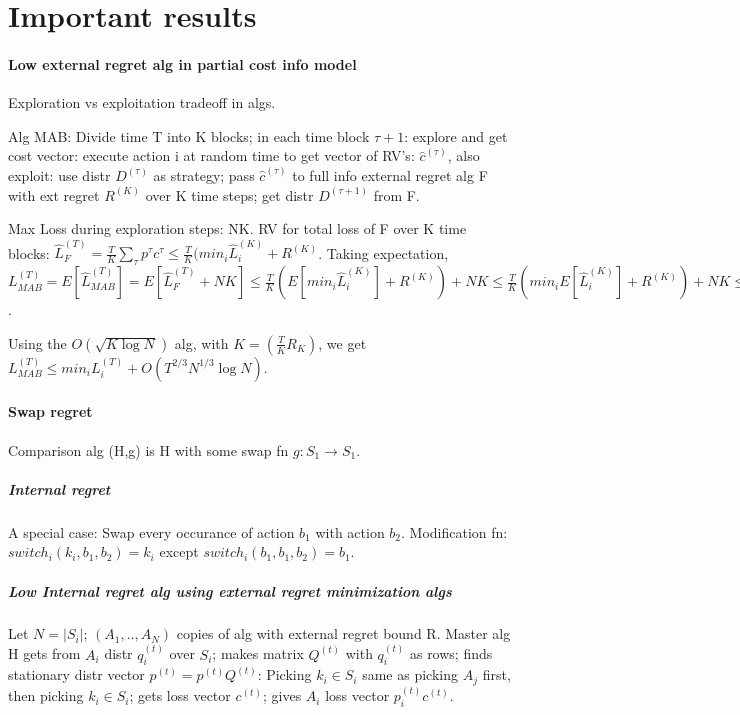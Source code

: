 \documentclass[10pt]{amsart}
\begin{document}
\part{Important results}
\subsection{Low external regret alg in partial cost info model}
Exploration vs exploitation tradeoff in algs.

Alg MAB: Divide time T into K blocks; in each time block $\tau+1$: explore and get cost vector: execute action i at random time to get vector of RV's: $\hat{c}^{(\tau)}$, also exploit: use distr $D^{(\tau)}$ as strategy; pass $\hat{c}^{(\tau)}$ to full info external regret alg F with ext regret $R^{(K)}$ over K time steps; get distr $D^{(\tau + 1)}$ from F.

Max Loss during exploration steps: NK. RV for total loss of F over K time blocks: $\hat{L}_{F}^{(T)} = \frac{T}{K}\sum_{\tau}p^{\tau}c^{\tau} \leq \frac{T}{K}(min_{i} \hat{L}_{i}^{(K)} + R^{(K)}$. Taking expectation, $L_{MAB}^{(T)} = E[\hat{L}_{MAB}^{(T)}]= E[\hat{L}_{F}^{(T)} + NK] \leq \frac{T}{K}(E[min_{i} \hat{L}_{i}^{(K)}] + R^{(K)}) + NK \leq \frac{T}{K}(min_{i} E[\hat{L}_{i}^{(K)}] + R^{(K)}) + NK \leq min_{i}L_{i}^{(T)} + \frac{T}{K}R^{(K)} + NK$.

Using the $O(\sqrt{K\log N})$ alg, with $K=(\frac{T}{K}R_{K})$, we get $L_{MAB}^{(T)} \leq min_{i}L_{i}^{(T)} + O(T^{2/3}N^{1/3}\log N)$.

\subsection{Swap regret}
Comparison alg (H,g) is H with some swap fn $g:S_{1} \to S_{1}$.

\subsubsection{Internal regret}
A special case: Swap every occurance of action $b_{1}$ with action $b_{2}$. Modification fn: $switch_{i}(k_{i},b_{1}, b_{2}) = k_{i}$ except $switch_{i}(b_{1},b_{1}, b_{2}) = b_{1}$.

\subsubsection{Low Internal regret alg using external regret minimization algs}
Let $N=|S_{i}|$; $(A_{1}, .., A_{N})$ copies of alg with external regret bound R. Master alg H gets from $A_{i}$ distr $q_{i}^{(t)}$ over $S_{i}$; makes matrix $Q^{(t)}$ with $q_{i}^{(t)}$ as rows; finds stationary distr vector $p^{(t)} = p^{(t)}Q^{(t)}$: Picking $k_{i} \in S_{i}$ same as picking $A_{j}$ first, then picking $k_{i} \in S_{i}$; gets loss vector $c^{(t)}$; gives $A_{i}$ loss vector $p_{i}^{(t)}c^{(t)}$.
\end{document}
